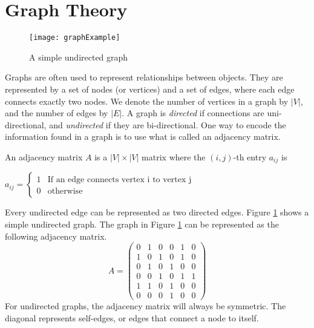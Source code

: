 
\label{lab:ImgSeg_eigenvalues}

\section*{Graph Theory}
\begin{figure}[h]
\texttt{[image: graphExample]}
\caption{A simple undirected graph}
\label{fig:example_graph}
\end{figure}


Graphs are often used to represent relationships between objects.
They are represented by a set of nodes (or vertices) and a set of edges, where each edge connects exactly two nodes.
We denote the number of vertices in a graph by $|V|$, and the number of edges by $|E|$.
A graph is \emph{directed} if connections are uni-directional, and \emph{undirected} if they are bi-directional.
One way to encode the information found in a graph is to use what is called an adjacency matrix.
\begin{definition} An adjacency matrix $A$ is a $|V| \times |V|$ matrix where the $(i,j)$-th entry $a_{ij}$ is
\begin{center}
	$a_{ij} = \begin{cases} 1 & \mbox{If an edge connects vertex i to vertex j} \\ 0 & \mbox{otherwise} \end{cases}$
\end{center}
\end{definition}

Every undirected edge can be represented as two directed edges.
Figure \ref{fig:example_graph} shows a simple undirected graph.
The graph in Figure \ref{fig:example_graph} can be represented as the following adjacency matrix.
\[
A = \begin{pmatrix}
0 & 1 & 0 & 0 & 1 & 0\\
1 & 0 & 1 & 0 & 1 & 0\\
0 & 1 & 0 & 1 & 0 & 0\\
0 & 0 & 1 & 0 & 1 & 1\\
1 & 1 & 0 & 1 & 0 & 0\\
0 & 0 & 0 & 1 & 0 & 0
\end{pmatrix}
\]
For undirected graphs, the adjacency matrix will always be symmetric.
The diagonal represents self-edges, or edges that connect a node to itself.

